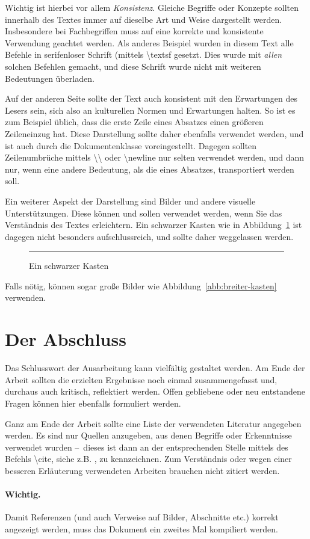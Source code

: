 \documentclass[draft]{tcs-seminar}
\begin{document}
Wichtig ist hierbei vor allem \emph{Konsistenz}.
Gleiche Begriffe oder Konzepte sollten innerhalb des Textes
immer auf dieselbe Art und Weise dargestellt werden.
Insbesondere bei Fachbegriffen muss auf eine korrekte
und konsistente Verwendung geachtet werden.
Als anderes Beispiel wurden in diesem Text alle Befehle
in serifenloser Schrift (mittels \textsf{\textbackslash textsf} gesetzt.
Dies wurde mit \emph{allen} solchen Befehlen gemacht,
und diese Schrift wurde nicht mit weiteren Bedeutungen überladen.

Auf der anderen Seite sollte der Text auch konsistent mit den Erwartungen
des Lesers sein, sich also an kulturellen Normen und Erwartungen halten.
So ist es zum Beispiel üblich, dass die erste Zeile eines Absatzes
einen größeren Zeileneinzug hat.
Diese Darstellung sollte daher ebenfalls verwendet werden,
und ist auch durch die Dokumentenklasse voreingestellt.
Dagegen sollten Zeilenumbrüche mittels \textsf{\textbackslash \textbackslash}
oder \textsf{\textbackslash newline} nur selten verwendet werden,
und dann nur, wenn eine andere Bedeutung, als die eines Absatzes,
transportiert werden soll.

Ein weiterer Aspekt der Darstellung sind Bilder
und andere visuelle Unterstützungen.
Diese können und sollen verwendet werden,
wenn Sie das Verständnis des Textes erleichtern.
Ein schwarzer Kasten wie in Abbildung~\ref{abb:kasten} ist dagegen nicht
besonders aufschlussreich, und sollte daher weggelassen werden.
\begin{figure}
  \centering
  \rule{3cm}{2cm}
  \caption{Ein schwarzer Kasten}
  \label{abb:kasten}
\end{figure}
Falls nötig, können sogar große Bilder wie Abbildung~\ref{abb:breiter-kasten}
verwenden.


\section{Der Abschluss}

Das Schlusswort der Ausarbeitung kann vielfältig gestaltet werden.
Am Ende der Arbeit sollten die erzielten Ergebnisse noch einmal zusammengefasst
und, durchaus auch kritisch, reflektiert werden.
Offen gebliebene oder neu entstandene Fragen
können hier ebenfalls formuliert werden.

Ganz am Ende der Arbeit sollte eine Liste
der verwendeten Literatur angegeben werden.
Es sind nur Quellen anzugeben,
aus denen Begriffe oder Erkenntnisse verwendet wurden
--~dieses ist dann an der entsprechenden Stelle mittels des Befehls
\textsf{\textbackslash cite}, siehe z.B. \cite{cotta06}, zu kennzeichnen.
Zum Verständnis oder wegen einer besseren Erläuterung verwendeten Arbeiten
brauchen nicht zitiert werden.
\paragraph{Wichtig.}
Damit Referenzen (und auch Verweise auf Bilder, Abschnitte etc.)
korrekt angezeigt werden, muss das Dokument ein zweites Mal kompiliert werden.

\begin{thebibliography}{9}  
    
\end{thebibliography}
\end{document}
